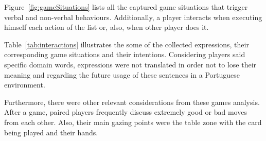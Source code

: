 Figure~\ref{fig:gameSituations} lists all the captured game situations that trigger verbal and non-verbal behaviours.
Additionally, a player interacts when executing himself each action of the list or, also, when other player does it.


\begin{table}[h]
\caption{Examples of expressions collected during the card game activity and its respective classification.}
\label{tab:interactions}
\end{table}


Table~\ref{tab:interactions} illustrates the some of the collected expressions, their corresponding game situations and their intentions.
Considering players said specific domain words, expressions were not translated in order not to lose their meaning and regarding the future usage of these sentences in a Portuguese environment.

Furthermore, there were other relevant considerations from these games analysis.
After a game, paired players frequently discuss extremely good or bad moves from each other.
Also, their main gazing points were the table zone with the card being played and their hands.


\cleardoublepage



